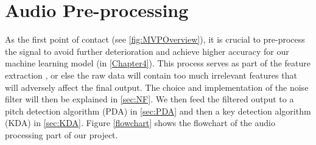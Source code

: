 \chapter{Audio Pre-processing} %
\label{Chapter5} %
As the first point of contact (see \cref{fig:MVPOverview}), it is crucial to pre-process the signal to avoid further deterioration
and achieve higher accuracy for our machine learning model (in \cref{Chapter4}). This process serves as part of the feature extraction 
, or else the raw data will contain too much irrelevant features that will adversely affect the final output. 
The choice and implementation of the noise filter will then be explained in \cref{sec:NF}. We then feed the filtered output 
to a pitch detection algorithm (PDA) in \cref{sec:PDA} and then a key detection algorithm (KDA) in \cref{sec:KDA}.
Figure \cref{flowchart} shows the flowchart of the audio processing part of our project.

        
        

